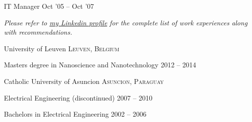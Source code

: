 \documentclass[10pt,a4paper]{article} %
\begin{document}
{{{{}}

\headedsubsection %
{IT Manager}
{Oct '05 -- Oct '07}
{}
}


\begin{center}
\textit{Please refer to \href{http://www.linkedin.com/in/lugaramirez}{my Linkedin profile} for the complete list of work experiences along with recommendations.}
\end{center}


\spacedhrule{-0.2em}{-0.4em} %



\headedsection %
{University of Leuven}
{\textsc{Leuven, Belgium}} {

\headedsubsection %
{Masters degree in Nanoscience and Nanotechnology}
{2012 -- 2014}
{}
}


\headedsection %
{Catholic University of Asuncion}
{\textsc{Asuncion, Paraguay}} {

\headedsubsection %
{Electrical Engineering \textnormal{(discontinued)}}
{2007 -- 2010} {}

\headedsubsection %
{Bachelors in Electrical Engineering}
{2002 -- 2006} {}
}

}
\end{document}

